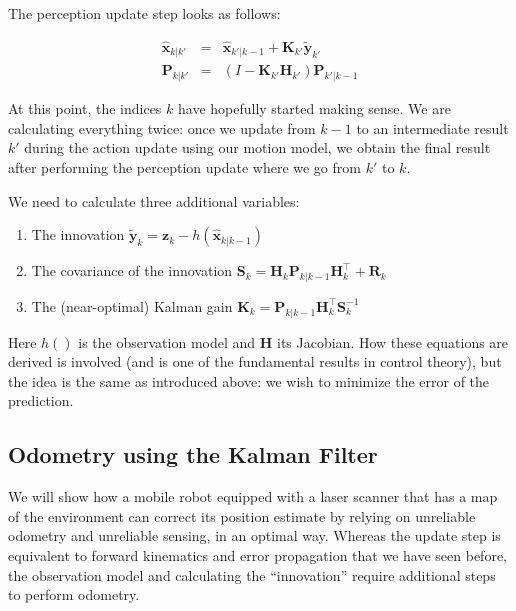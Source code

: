 The perception update step looks as follows:

\begin{eqnarray}
\hat{\boldsymbol{x}}_{k|k'} &=& \hat{\boldsymbol{x}}_{k'|k-1} + \boldsymbol{K}_{k'}\tilde{\boldsymbol{y}}_{k'}\\
\boldsymbol{P}_{k|k'} &=& (I - \boldsymbol{K}_{k'} {\boldsymbol{H}_{k'}}) \boldsymbol{P}_{k'|k-1}
\end{eqnarray}

At this point, the indices $ k$ have hopefully started making sense. We are calculating everything twice: once we update from $ k-1$ to an intermediate result $ k'$ during the action update using our motion model, we obtain the final result after performing the perception update where we go from $ k'$ to $ k$.

We need to calculate three additional variables:
\begin{enumerate}
\item The innovation $ \tilde{\boldsymbol{y}}_{k}=\boldsymbol{z}_{k}-h(\hat{\boldsymbol{x}}_{k|k-1})$
\item The covariance of the innovation $\boldsymbol{S}_{k}={\boldsymbol{H}_{k}}\boldsymbol{P}_{k|k-1}{\boldsymbol{H}_{k}^\top}+\boldsymbol{R}_{k}$
\item The (near-optimal)  Kalman gain $ \boldsymbol{K}_{k}=\boldsymbol{P}_{k|k-1}{\boldsymbol{H}_{k}^\top}\boldsymbol{S}_{k}^{-1}$
\end{enumerate}
Here $ h()$ is the observation model and $ \boldsymbol{H}$ its Jacobian. How these equations are derived is involved (and is one of the fundamental results in control theory), but the idea is the same as introduced above: we wish to minimize the error of the prediction.

\subsection{Odometry using the Kalman Filter}
We will show how a mobile robot equipped with a laser scanner that has a map of the environment can correct its position estimate by relying on unreliable odometry and unreliable sensing, in an optimal way.
Whereas the update step is equivalent to forward kinematics and error propagation that we have seen before, the observation model and calculating the ``innovation'' require additional steps to perform odometry.

